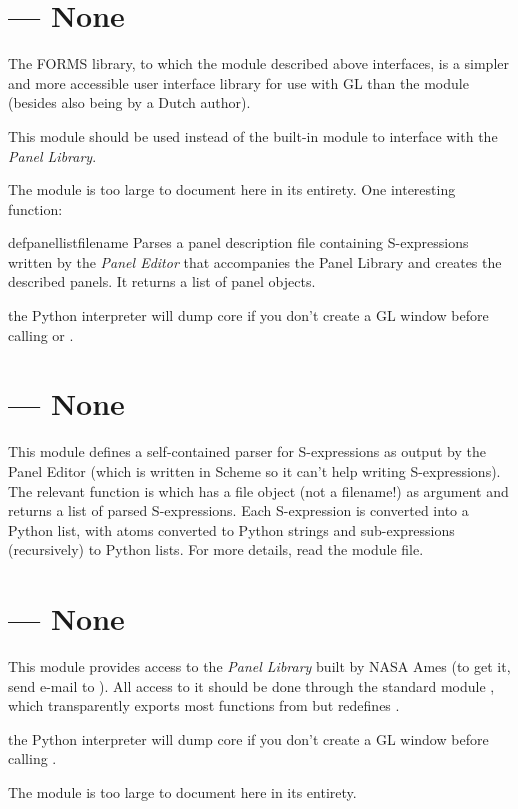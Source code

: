 \section{ ---
         None}



 The FORMS library, to which the
 module described above interfaces, is a
simpler and more accessible user interface library for use with GL
than the  module (besides also being by a Dutch author).

This module should be used instead of the built-in module
to interface with the
\emph{Panel Library}.

The module is too large to document here in its entirety.
One interesting function:

\begin{funcdesc}{defpanellist}{filename}
Parses a panel description file containing S-expressions written by the
\emph{Panel Editor}
that accompanies the Panel Library and creates the described panels.
It returns a list of panel objects.
\end{funcdesc}

the Python interpreter will dump core if you don't create a GL window
before calling
or
.

\section{ ---
         None}



This module defines a self-contained parser for S-expressions as output
by the Panel Editor (which is written in Scheme so it can't help writing
S-expressions).
The relevant function is
which has a file object (not a filename!) as argument and returns a list
of parsed S-expressions.
Each S-expression is converted into a Python list, with atoms converted
to Python strings and sub-expressions (recursively) to Python lists.
For more details, read the module file.

\section{ ---
         None}



This module provides access to the
\emph{Panel Library}
built by NASA Ames (to get it, send e-mail to
).
All access to it should be done through the standard module
,
which transparently exports most functions from
but redefines
.

the Python interpreter will dump core if you don't create a GL window
before calling
.

The module is too large to document here in its entirety.
